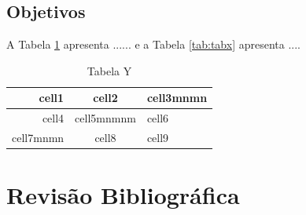 \documentclass[12pt,a4paper, brazil]{article}
\begin{document}
\cite{bonawitz2019towards}

\subsection{Objetivos}


    A Tabela \ref{tab:taby} apresenta ...... e a Tabela \ref{tab:tabx} apresenta ....

    \begin{table}[!ht]
        \centering
        \begin{tabular}{ |r|c|l| }
            \hline
             cell1 & cell2 & cell3mnmn \\
             \hline
             \hline 
             cell4 & cell5mnmnm & cell6 \\
             \hline
             cell7mnmn & cell8 & cell9 \\
             \hline   
            \end{tabular}
            \caption{Tabela Y}
            \label{tab:taby}
    \end{table}
    
\cite{WinNT}

\cite{salahdine2019social}

\section{Revisão Bibliográfica} \label{sec:revisao}


\printbibliography
\end{document}
